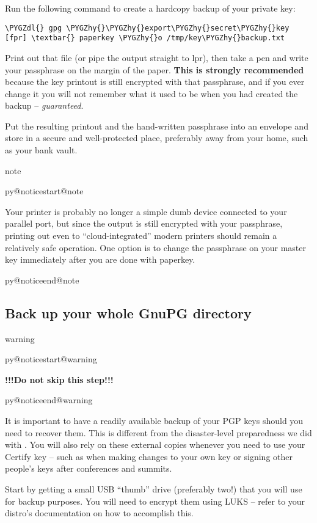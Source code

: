 \documentclass[a4paper,8pt,english]{sphinxmanual}
\makeatletter
\renewenvironment{notice}[2]{%
          \def\py@noticetype{#1}
          \begin{coloredbox}{#1}
          \bf\it
          \par\strong{#2}
          \csname py@noticestart@#1\endcsname
        }
	{
          \csname py@noticeend@\py@noticetype\endcsname
          \end{coloredbox}
        }
\def\PYGZdl{\char`\$}
\def\PYGZhy{\char`\-}
\makeatother
\begin{document}
Run the following command to create a hardcopy backup of your private
key:

\begin{Verbatim}[commandchars=\\\{\}]
\PYGZdl{} gpg \PYGZhy{}\PYGZhy{}export\PYGZhy{}secret\PYGZhy{}key [fpr] \textbar{} paperkey \PYGZhy{}o /tmp/key\PYGZhy{}backup.txt
\end{Verbatim}

Print out that file (or pipe the output straight to lpr), then take a
pen and write your passphrase on the margin of the paper. \textbf{This is
strongly recommended} because the key printout is still encrypted with
that passphrase, and if you ever change it you will not remember what it
used to be when you had created the backup -- \emph{guaranteed}.

Put the resulting printout and the hand-written passphrase into an envelope
and store in a secure and well-protected place, preferably away from your
home, such as your bank vault.

\begin{notice}{note}{Note:}
Your printer is probably no longer a simple dumb device connected to
your parallel port, but since the output is still encrypted with
your passphrase, printing out even to ``cloud-integrated'' modern
printers should remain a relatively safe operation. One option is to
change the passphrase on your master key immediately after you are
done with paperkey.
\end{notice}


\subsection{Back up your whole GnuPG directory}
\label{process/maintainer-pgp-guide:back-up-your-whole-gnupg-directory}
\begin{notice}{warning}{Warning:}
\textbf{!!!Do not skip this step!!!}
\end{notice}

It is important to have a readily available backup of your PGP keys
should you need to recover them. This is different from the
disaster-level preparedness we did with . You will also rely
on these external copies whenever you need to use your Certify key --
such as when making changes to your own key or signing other people's
keys after conferences and summits.

Start by getting a small USB ``thumb'' drive (preferably two!) that you
will use for backup purposes. You will need to encrypt them using LUKS
-- refer to your distro's documentation on how to accomplish this.
\end{document}
